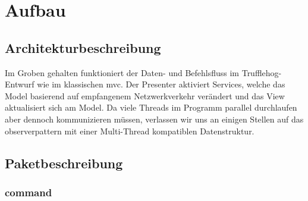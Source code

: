 \chapter{Aufbau \programname}

\section{Architekturbeschreibung}
Im Groben gehalten funktioniert der Daten- und Befehlsfluss im Trufflehog-Entwurf
wie im klassischen \gls{mvc}. Der Presenter aktiviert Services, welche das Model basierend
auf empfangenem Netzwerkverkehr verändert und das View aktualisiert sich am Model.
Da viele Threads im Programm parallel durchlaufen aber dennoch kommunizieren müssen,
verlassen wir uns an einigen Stellen auf das \gls{observerpattern} mit einer
Multi-Thread kompatiblen Datenstruktur.\newline
\newline

\section{Paketbeschreibung}

\subsection{command}
\label{subsec:command}

